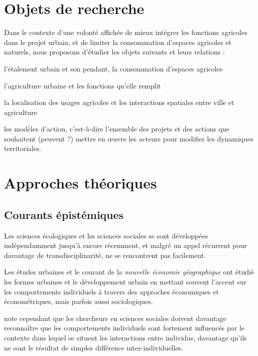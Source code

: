 \section{Objets de recherche}

Dans le contexte d'une volonté affichée de mieux intégrer les fonctions agricoles
dans le projet urbain,
et de limiter la consommation d'espaces agricoles et naturels,
nous proposons d'étudier les objets suivants et leurs relations :

\startitemize[packed]

\item l'étalement urbain et son pendant, la consommation d'espaces agricoles
\item l'agriculture urbaine et les fonctions qu'elle remplit
\item la localisation des usages agricoles
  et les interactions spatiales entre ville et agriculture
\item les modèles d'action, c'est-à-dire l'ensemble
  des projets et des actions que souhaitent (peuvent ?) mettre en œuvre
  les acteurs pour modifier les dynamiques territoriales.

\stopitemize

\section{Approches théoriques}

\subsection{Courants épistémiques}

Les sciences écologiques et les sciences sociales se sont développées
indépendamment jusqu'à encore récemment,
et malgré un appel récurrent pour davantage de transdisciplinarité,
ne se rencontrent pas facilement.

Les études urbaines et le courant de la {\em nouvelle économie géographique}
ont étudié les formes urbaines et le développement urbain en
mettant souvent l'accent sur les comportements individuels
à travers des approches économiques et économétriques,
mais parfois aussi sociologiques.

\citet{ostrom_background_2011} note cependant que les chercheurs en sciences sociales
doivent davantage reconnaître que les comportements individuels
sont fortement influencés par le contexte dans lequel se situent
les interactions entre individus, davantage qu'ils ne sont le résultat
de simples différence inter-individuelles.

